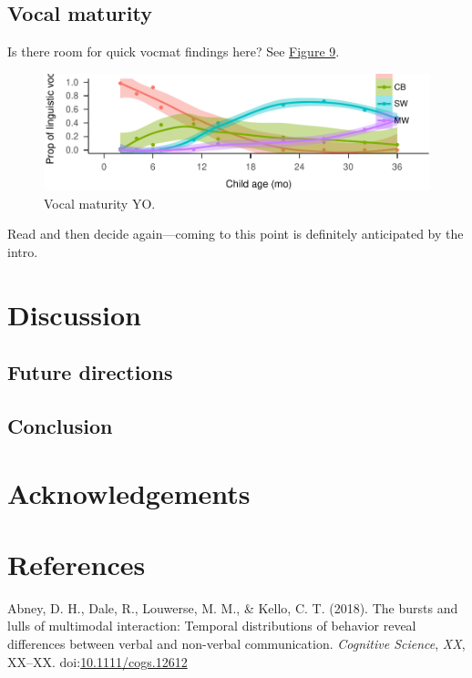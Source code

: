 \documentclass[floatsintext,man]{apa6}
\theoremstyle{definition}
\theoremstyle{definition}
\theoremstyle{definition}
\theoremstyle{remark}
\begin{document}
\subsection{Vocal maturity}\label{vocal-maturity}

Is there room for quick vocmat findings here? See
\protect\hyperlink{fig9}{Figure 9}.

\begin{figure}
\centering
\includegraphics{Tseltal-CLE_files/figure-latex/fig9-1.pdf}
\caption{\label{fig:fig9}Vocal maturity YO.}
\end{figure}

Read and then decide again---coming to this point is definitely
anticipated by the intro.

\section{Discussion}\label{disc}

\subsection{Future directions}\label{disc-future}

\subsection{Conclusion}\label{disc-conclusion}

\section{Acknowledgements}\label{acknowledgements}

\newpage

\section{References}\label{refs}

\begingroup
\setlength{\parindent}{-0.5in} \setlength{\leftskip}{0.5in}

\hypertarget{refs}{}
\hypertarget{ref-abney2018bursts}{}
Abney, D. H., Dale, R., Louwerse, M. M., \& Kello, C. T. (2018). The
bursts and lulls of multimodal interaction: Temporal distributions of
behavior reveal differences between verbal and non-verbal communication.
\emph{Cognitive Science}, \emph{XX}, XX--XX.
doi:\href{https://doi.org/10.1111/cogs.12612}{10.1111/cogs.12612}
\end{document}
